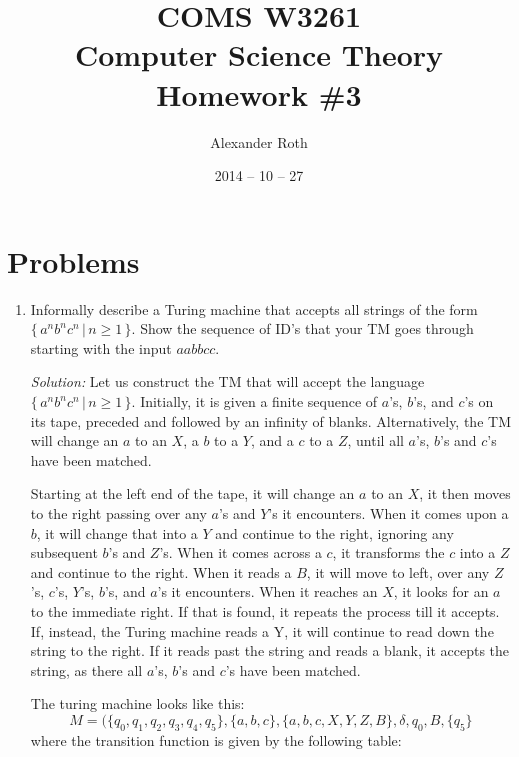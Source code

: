 \documentclass[]{article}
\begin{document}
\newtheorem{thm}{Theorem}
\title{COMS W3261 \\ Computer Science Theory \\ Homework \#3}
\author{Alexander Roth}
\date{2014 -- 10 -- 27}
\maketitle
\section*{Problems}
\begin{enumerate}
\item Informally describe a Turing machine that accepts all strings of the form
$\{\,a^nb^nc^n\,|\,n\geq1\,\}$. Show the sequence of ID's that your TM goes
through starting with the input $aabbcc$.
\item[\emph{Solution:}] Let us construct the TM that will accept the language
$\{\,a^nb^nc^n\,|\,n\geq1\,\}$. Initially, it is given a finite sequence of
$a$'s, $b$'s, and $c$'s on its tape, preceded and followed by an infinity of
blanks. Alternatively, the TM will change an $a$ to an $X$, a $b$ to a $Y$, and
a $c$ to a $Z$, until all $a$'s, $b$'s and $c$'s have been matched.

Starting at the left end of the tape, it will change an $a$ to an $X$, it then
moves to the right passing over any $a$'s and $Y$'s it encounters. When it comes
upon a $b$, it will change that into a $Y$ and continue to the right, ignoring
any subsequent $b$'s and $Z$'s. When it comes across a $c$, it transforms the
$c$ into a $Z$ and continue to the right. When it reads a $B$, it will move to
left, over any $Z$'s, $c$'s, $Y$'s, $b$'s, and $a$'s it encounters. When it
reaches an $X$, it looks for an $a$ to the immediate right. If that is found, it
repeats the process till it accepts. If, instead, the Turing machine reads a Y,
it will continue to read down the string to the right. If it reads past the
string and reads a blank, it accepts the string, as there all $a$'s, $b$'s and
$c$'s have been matched.

The turing machine looks like this:
\[ M = (\{q_0, q_1, q_2, q_3, q_4, q_5\}, \{a, b, c\}, \{a, b, c, X, Y, Z, B\},
\delta, q_0, B, \{q_5\} \]
where the transition function is given by the following table:\\


\end{enumerate}
\end{document}
